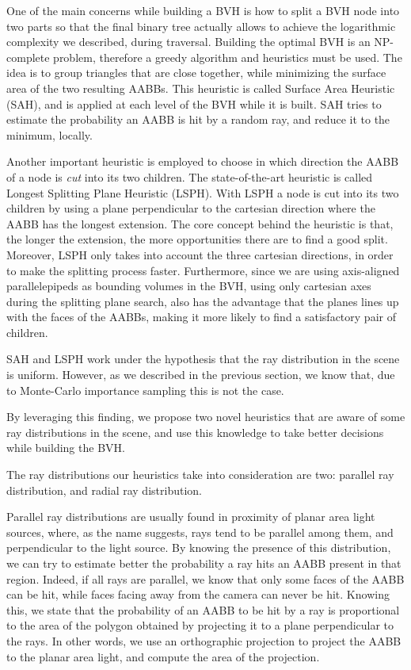 \documentclass{PoliMi_MasterThesis}
\begin{document}
One of the main concerns while building a BVH is how to split a BVH node into two parts so that the final binary tree actually allows to achieve the logarithmic complexity we described, during traversal. Building the optimal BVH is an NP-complete problem, therefore a greedy algorithm and heuristics must be used. The idea is to group triangles that are close together, while minimizing the surface area of the two resulting AABBs. This heuristic is called Surface Area Heuristic (SAH), and is applied at each level of the BVH while it is built. SAH tries to estimate the probability an AABB is hit by a random ray, and reduce it to the minimum, locally.

Another important heuristic is employed to choose in which direction the AABB of a node is \textit{cut} into its two children. The state-of-the-art heuristic is called Longest Splitting Plane Heuristic (LSPH). With LSPH a node is cut into its two children by using a plane perpendicular to the cartesian direction where the AABB has the longest extension. The core concept behind the heuristic is that, the longer the extension, the more opportunities there are to find a good split. Moreover, LSPH only takes into account the three cartesian directions, in order to make the splitting process faster. Furthermore, since we are using axis-aligned parallelepipeds as bounding volumes in the BVH, using only cartesian axes during the splitting plane search, also has the advantage that the planes lines up with the faces of the AABBs, making it more likely to find a satisfactory pair of children.

SAH and LSPH work under the hypothesis that the ray distribution in the scene is uniform. However, as we described in the previous section, we know that, due to Monte-Carlo importance sampling this is not the case.

By leveraging this finding, we propose two novel heuristics that are aware of some ray distributions in the scene, and use this knowledge to take better decisions while building the BVH.

The ray distributions our heuristics take into consideration are two: parallel ray distribution, and radial ray distribution.

Parallel ray distributions are usually found in proximity of planar area light sources, where, as the name suggests, rays tend to be parallel among them, and perpendicular to the light source. By knowing the presence of this distribution, we can try to estimate better the probability a ray hits an AABB present in that region. Indeed, if all rays are parallel, we know that only some faces of the AABB can be hit, while faces facing away from the camera can never be hit. Knowing this, we state that the probability of an AABB to be hit by a ray is proportional to the area of the polygon obtained by projecting it to a plane perpendicular to the rays. In other words, we use an orthographic projection to project the AABB to the planar area light, and compute the area of the projection.
\end{document}
